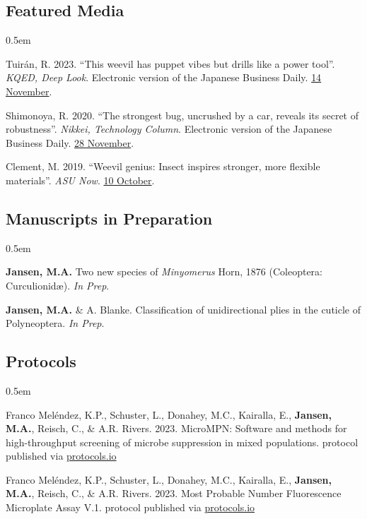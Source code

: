 \documentclass[12pt,a4paper]{article}
\begin{document}
	\subsection*{Featured Media}
	\begin{description}
		\itemsep0.5em
		\item Tuir\'{a}n, R. 2023. ``This weevil has puppet vibes but drills like a power tool''. \textit{KQED, Deep Look}. Electronic version of the Japanese Business Daily. \href{https://www.kqed.org/science/1985068/this-weevil-has-puppet-vibes-but-drills-like-a-power-tool}{14 November}.
		\item Shimonoya, R. 2020. ``The strongest bug, uncrushed by a car, reveals its secret of robustness''. \textit{Nikkei, Technology Column}. Electronic version of the Japanese Business Daily. \href{https://www.nikkei.com/article/DGXMZO66746060X21C20A1MY1000/}{28 November}.
		\item Clement, M. 2019. ``Weevil genius: Insect inspires stronger, more flexible materials''. \textit{ASU Now}. \href{https://asunow.asu.edu/20191010-discoveries-asu-engineering-weevil-inspires-stronger-flexible-materials}{10 October}.
		
	\end{description}

	\subsection*{Manuscripts in Preparation}
		\begin{description}
			\itemsep0.5em
			\item \textbf{Jansen, M.A.} Two new species of \textit{Minyomerus} Horn, 1876 (Coleoptera: Curculionid\ae). \textit{In Prep}.
			\item \textbf{Jansen, M.A.} \& A. Blanke. Classification of unidirectional plies in the cuticle of Polyneoptera. \textit{In Prep}.
		\end{description}
	
	\subsection*{Protocols}
	\begin{description}
		\itemsep0.5em
		\item Franco Mel\'{e}ndez, K.P., Schuster, L., Donahey, M.C., Kairalla, E., \textbf{Jansen, M.A.}, Reisch, C., \& A.R. Rivers. 2023. MicroMPN: Software and methods for high-throughput screening of microbe suppression in mixed populations. protocol published via \href{dx.doi.org/10.17504/protocols.io.81wgbymenvpk/v1}{protocols.io}
		\item Franco Mel\'{e}ndez, K.P., Schuster, L., Donahey, M.C., Kairalla, E., \textbf{Jansen, M.A.}, Reisch, C., \& A.R. Rivers. 2023. Most Probable Number Fluorescence Microplate Assay V.1. protocol published via \href{dx.doi.org/10.17504/protocols.io.q26g7yqk1gwz/v1}{protocols.io}
	\end{description}
\end{document}
